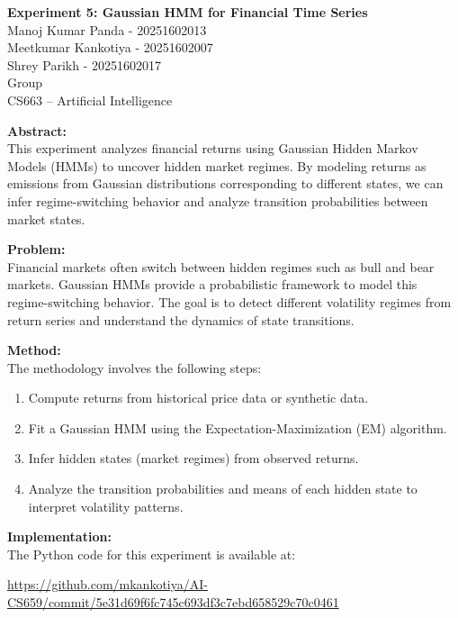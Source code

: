 \documentclass[a4paper,12pt]{article}  %
\begin{document}
\begin{center}
\LARGE \textbf{Experiment 5: Gaussian HMM for Financial Time Series} \\[5mm]
\large
Manoj Kumar Panda - 20251602013 \\
Meetkumar Kankotiya - 20251602007 \\
Shrey Parikh - 20251602017 \\
Group \\ CS663 -- Artificial Intelligence
\end{center}

\vspace{5mm}

\noindent \textbf{Abstract:} \\
This experiment analyzes financial returns using Gaussian Hidden Markov Models (HMMs) to uncover hidden market regimes. By modeling returns as emissions from Gaussian distributions corresponding to different states, we can infer regime-switching behavior and analyze transition probabilities between market states.

\vspace{3mm}
\noindent \textbf{Problem:} \\
Financial markets often switch between hidden regimes such as bull and bear markets. Gaussian HMMs provide a probabilistic framework to model this regime-switching behavior. The goal is to detect different volatility regimes from return series and understand the dynamics of state transitions.

\vspace{3mm}
\noindent \textbf{Method:} \\
The methodology involves the following steps:
\begin{enumerate}
    \item Compute returns from historical price data or synthetic data.
    \item Fit a Gaussian HMM using the Expectation-Maximization (EM) algorithm.
    \item Infer hidden states (market regimes) from observed returns.
    \item Analyze the transition probabilities and means of each hidden state to interpret volatility patterns.
\end{enumerate}

\vspace{3mm}
\noindent \textbf{Implementation:} \\
The Python code for this experiment is available at:
\begin{center}
\url{https://github.com/mkankotiya/AI-CS659/commit/5e31d69f6fc745c693df3c7ebd658529c70c0461}  %
\end{center}
\end{document}
